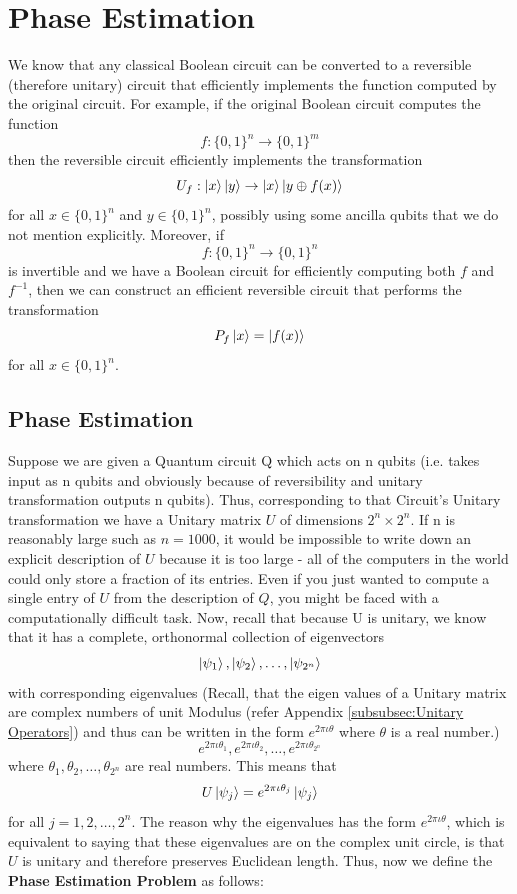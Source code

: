 \chapter{Phase Estimation}
We know that any classical Boolean circuit can be converted to a reversible (therefore unitary) circuit that efficiently implements the function computed by the original
circuit. For example, if the original Boolean circuit computes the function
\[
    f:\{0,1\}^n \rightarrow \{0,1\}^m
\]
then the reversible circuit efficiently implements the transformation
\[
    U_f:\ket{x}\ket{y} \rightarrow \ket{x}\ket{y\oplus f(x)}
\]
for all $x \in \{0,1\}^n$ and $y \in \{0,1\}^n$, possibly using some ancilla qubits that we do not
mention explicitly. Moreover, if 
\[
    f:\{0,1\}^n\rightarrow \{0,1\}^n 
\]
is invertible and we have a Boolean circuit for efficiently computing both $f$ and $f^{-1}$, then we can construct an efficient reversible circuit that performs the transformation
\[
P_f\ket{x}=\ket{f(x)}
\]
for all $x \in \{0,1\}^n$. 

\section{Phase Estimation}
Suppose we are given a Quantum circuit Q which acts on n qubits (i.e. takes input as n qubits and obviously because of reversibility and unitary transformation outputs n qubits).
Thus, corresponding to that Circuit's Unitary transformation we have a Unitary matrix $U$ of dimensions $2^n \times 2^n$. If n is reasonably large such as $n=1000$, it would be impossible to write down an explicit description of $U$ because it is too large - all of the computers in the world could only store a fraction of its entries. Even if you just wanted to compute a single entry of $U$ from the description of $Q$, you might be faced with a computationally difficult task.
Now, recall that because U is unitary, we know that it has a complete, orthonormal collection of eigenvectors
\[
\ket{\psi_1},\ket{\psi_2},\ldots,\ket{\psi_{2^n}}
\]
with corresponding eigenvalues (Recall, that the eigen values of a Unitary matrix are complex numbers of unit Modulus (refer Appendix \ref{subsubsec:Unitary Operators})
and thus can be written in the form $e^{2\pi\iota \theta}$ where $\theta$ is a real number.)
\[
e^{2\pi\iota \theta_1},e^{2\pi\iota \theta_2},\ldots,e^{2\pi\iota \theta_{2^n}}
\]
where $\theta_1,\theta_2,\ldots,\theta_{2^n}$ are real numbers. This means that 
\[
U\ket{\psi_j}=e^{2\pi\iota \theta_j}\ket{\psi_j}
\]
for all $j=1,2,\ldots,2^n$. The reason why the eigenvalues has the form $e^{2\pi \iota \theta}$, which is equivalent to saying that these eigenvalues are on the complex unit circle, is that $U$ is unitary and therefore preserves Euclidean length. Thus, now we define the \textbf{Phase Estimation Problem} as follows:\\

